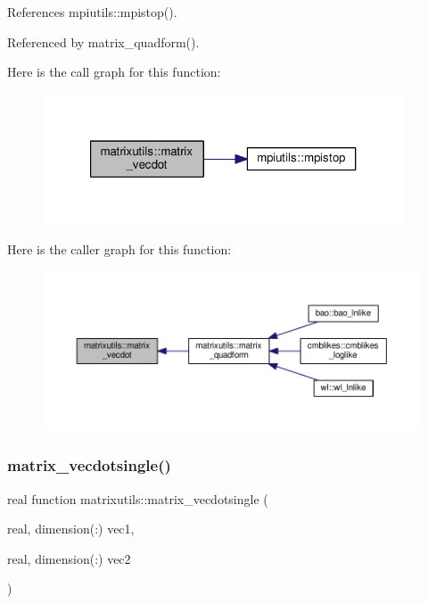 References mpiutils\+::mpistop().



Referenced by matrix\+\_\+quadform().

Here is the call graph for this function\+:
\nopagebreak
\begin{figure}[H]
\begin{center}
\leavevmode
\includegraphics[width=304pt]{namespacematrixutils_a14ec6bb3e63d084752f528c47653f7d7_cgraph}
\end{center}
\end{figure}
Here is the caller graph for this function\+:
\nopagebreak
\begin{figure}[H]
\begin{center}
\leavevmode
\includegraphics[width=350pt]{namespacematrixutils_a14ec6bb3e63d084752f528c47653f7d7_icgraph}
\end{center}
\end{figure}
\mbox{\label{namespacematrixutils_a7c0b5ddd8a7ff3cd1231b2b56a63aefc}} 
\subsubsection{\texorpdfstring{matrix\+\_\+vecdotsingle()}{matrix\_vecdotsingle()}}
{\footnotesize\ttfamily real function matrixutils\+::matrix\+\_\+vecdotsingle (\begin{DoxyParamCaption}\item[{real, dimension(\+:)}]{vec1,  }\item[{real, dimension(\+:)}]{vec2 }\end{DoxyParamCaption})}



